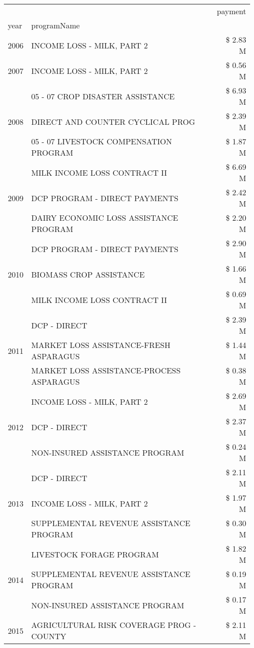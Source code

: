 \begin{tabular}{llr}
\toprule
 &  & payment \\
year & programName &  \\
\midrule
2006 & INCOME LOSS - MILK, PART 2 & \$ 2.83 M \\
\cline{1-3}
2007 & INCOME LOSS - MILK, PART 2 & \$ 0.56 M \\
\cline{1-3}
\multirow[t]{3}{*}{2008} & 05 - 07 CROP DISASTER ASSISTANCE & \$ 6.93 M \\
 & DIRECT AND COUNTER CYCLICAL PROG & \$ 2.39 M \\
 & 05 - 07 LIVESTOCK COMPENSATION PROGRAM & \$ 1.87 M \\
\cline{1-3}
\multirow[t]{3}{*}{2009} & MILK INCOME LOSS CONTRACT II & \$ 6.69 M \\
 & DCP PROGRAM - DIRECT PAYMENTS & \$ 2.42 M \\
 & DAIRY ECONOMIC LOSS ASSISTANCE PROGRAM & \$ 2.20 M \\
\cline{1-3}
\multirow[t]{3}{*}{2010} & DCP PROGRAM - DIRECT PAYMENTS & \$ 2.90 M \\
 & BIOMASS CROP ASSISTANCE & \$ 1.66 M \\
 & MILK INCOME LOSS CONTRACT II & \$ 0.69 M \\
\cline{1-3}
\multirow[t]{3}{*}{2011} & DCP - DIRECT & \$ 2.39 M \\
 & MARKET LOSS ASSISTANCE-FRESH ASPARAGUS & \$ 1.44 M \\
 & MARKET LOSS ASSISTANCE-PROCESS ASPARAGUS & \$ 0.38 M \\
\cline{1-3}
\multirow[t]{3}{*}{2012} & INCOME LOSS - MILK, PART 2 & \$ 2.69 M \\
 & DCP - DIRECT & \$ 2.37 M \\
 & NON-INSURED ASSISTANCE PROGRAM & \$ 0.24 M \\
\cline{1-3}
\multirow[t]{3}{*}{2013} & DCP - DIRECT & \$ 2.11 M \\
 & INCOME LOSS - MILK, PART 2 & \$ 1.97 M \\
 & SUPPLEMENTAL REVENUE ASSISTANCE PROGRAM & \$ 0.30 M \\
\cline{1-3}
\multirow[t]{3}{*}{2014} & LIVESTOCK FORAGE PROGRAM & \$ 1.82 M \\
 & SUPPLEMENTAL REVENUE ASSISTANCE PROGRAM & \$ 0.19 M \\
 & NON-INSURED ASSISTANCE PROGRAM & \$ 0.17 M \\
\cline{1-3}
\multirow[t]{3}{*}{2015} & AGRICULTURAL RISK COVERAGE PROG - COUNTY & \$ 2.11 M \\

\end{tabular}
